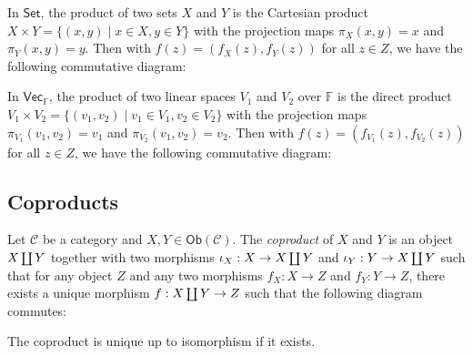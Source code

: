 \documentclass[
	11pt, %
	fleqn, %
	a4paper, %
]{LegrandOrangeBook}
\newcommand{\F}{\mathbb{F}} %
\newcommand{\C}{\mathcal{C}} %
\newcommand{\Set}{\boldsymbol{\mathsf{Set}}} %
\newcommand{\Vect}{\boldsymbol{\mathsf{Vec}}} %
\newcommand{\Ob}[1]{\mathsf{Ob}(#1)} %
\DeclareRobustCommand{\coprod}{\mathop{\text{\fakecoprod}}}
\newcommand{\fakecoprod}{%
    \sbox0{$\prod$}%
    \smash{\raisebox{\dimexpr.9625\depth-\dp0}{\scalebox{1}[-1]{$\prod$}}}%
    \vphantom{$\prod$}%
}
\begin{document}
\begin{example}
    In $\Set$, the product of two sets $X$ and $Y$ is the Cartesian product $X \times Y = \{ (x, y) \mid x \in X, y \in Y \}$ with the projection maps $\pi_X(x, y) = x$ and $\pi_Y(x, y) = y$. Then with $f(z) = (f_X(z), f_Y(z))$ for all $z \in Z$, we have the following commutative diagram:
    \begin{center}
    \end{center}
    
\end{example}

\begin{example}
    In $\Vect_{\F}$, the product of two linear spaces $V_1$ and $V_2$ over $\F$ is the direct product $V_1 \times V_2 = \{ (v_1, v_2) \mid v_1 \in V_1, v_2 \in V_2 \}$ with the projection maps $\pi_{V_1}(v_1, v_2) = v_1$ and $\pi_{V_2}(v_1, v_2) = v_2$. Then with $f(z) = (f_{V_1}(z), f_{V_2}(z))$ for all $z \in Z$, we have the following commutative diagram:
    \begin{center}
    \end{center}
\end{example}

\subsection{Coproducts}

\begin{definition}[Coproducts]
    Let $\C$ be a category and $X, Y \in \Ob{\C}$. The \emph{coproduct} of $X$ and $Y$ is an object $X \coprod Y$ together with two morphisms $\iota_X : X \to X \coprod Y$ and $\iota_Y : Y \to X \coprod Y$ such that for any object $Z$ and any two morphisms $f_X : X \to Z$ and $f_Y : Y \to Z$, there exists a unique morphism $f : X \coprod Y \to Z$ such that the following diagram commutes:
    \begin{center}
    \end{center}
\end{definition}
\begin{remark}
    The coproduct is unique up to isomorphism if it exists.
\end{remark}
\end{document}
